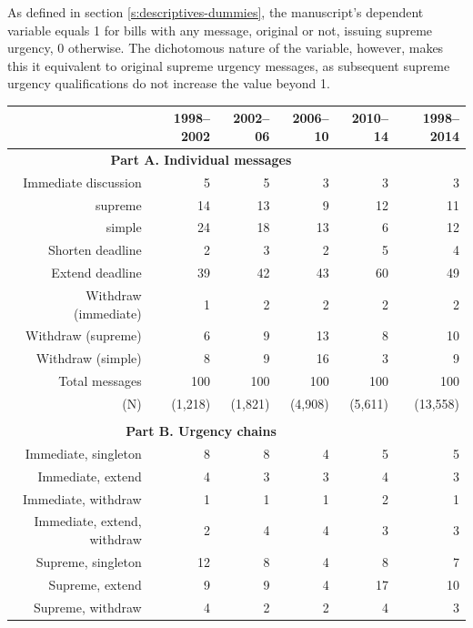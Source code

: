 \documentclass[letter,12pt]{article}
\begin{document}
As defined in section \ref{s:descriptives-dummies}, the manuscript's dependent variable equals 1 for bills with any message, original or not, issuing supreme urgency, 0 otherwise. The dichotomous nature of the variable, however, makes this it equivalent to original supreme urgency messages, as subsequent supreme urgency qualifications do not increase the value beyond 1. 

\begin{table}
\centering
\begin{tabular}{rrrrr|r}
      & 1998--2002 & 2002--06 & 2006--10 & 2010--14 & 1998--2014 \\ \hline
 \multicolumn{5}{c|}{\textbf{Part A. Individual messages}} \\
 Immediate discussion& 5  & 5  & 3  & 3  & 3 \\ 
 supreme             & 14 & 13 & 9  & 12 & 11 \\ 
 simple              & 24 & 18 & 13 & 6  & 12 \\ \hdashline
 Shorten deadline    & 2  & 3  & 2  & 5  &  4 \\ 
 Extend deadline     & 39 & 42 & 43 & 60 & 49 \\ \hdashline
 Withdraw (immediate)& 1  & 2  & 2  & 2  &  2 \\ 
 Withdraw (supreme)  & 6  & 9  & 13 & 8  & 10 \\ 
 Withdraw (simple)   & 8  & 9  & 16 & 3  & 9  \\ \hline
 Total messages      & 100 & 100 & 100 & 100 & 100 \\ 
(N)                  & (1,218) & (1,821) & (4,908) & (5,611) & (13,558)\\ 
\\ [-1.5ex]
 \multicolumn{5}{c|}{\textbf{Part B. Urgency chains}}  \\
Immediate, singleton        & 8  & 8  & 4  & 5  &   5  \\
Immediate, extend           & 4  & 3  & 3  & 4  &   3  \\
Immediate, withdraw         & 1  & 1  & 1  & 2  &   1  \\
Immediate, extend, withdraw & 2  & 4  & 4  & 3  &   3  \\ \hdashline
Supreme, singleton          & 12 & 8  & 4  & 8  &   7  \\
Supreme, extend             & 9  & 9  & 4  & 17 &  10  \\
Supreme, withdraw           & 4  & 2  & 2  & 4  &   3  \\

\end{tabular}
\end{table}
\end{document}
